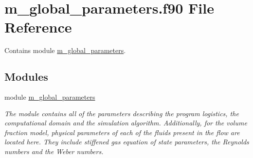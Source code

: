 \hypertarget{m__global__parameters_8f90}{}\section{m\+\_\+global\+\_\+parameters.\+f90 File Reference}
\label{m__global__parameters_8f90}


Contains module \hyperlink{namespacem__global__parameters}{m\+\_\+global\+\_\+parameters}.  


\subsection*{Modules}
\begin{DoxyCompactItemize}
\item 
module \hyperlink{namespacem__global__parameters}{m\+\_\+global\+\_\+parameters}
\begin{DoxyCompactList}\small\item\em The module contains all of the parameters describing the program logistics, the computational domain and the simulation algorithm. Additionally, for the volume fraction model, physical parameters of each of the fluids present in the flow are located here. They include stiffened gas equation of state parameters, the Reynolds numbers and the Weber numbers. \end{DoxyCompactList}\end{DoxyCompactItemize}
